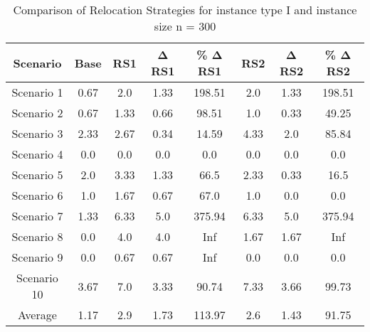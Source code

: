 \begin{table}[H]
\centering
\begin{tabular}{cccccccc}
  \hline
  \textbf{Scenario} & \textbf{Base} & \textbf{RS1} & \textbf{Δ RS1} & \textbf{\% Δ RS1} & \textbf{RS2} & \textbf{Δ RS2} & \textbf{\% Δ RS2} \\\hline
  Scenario 1 & 0.67 & 2.0 & 1.33 & 198.51 & 2.0 & 1.33 & 198.51 \\
  Scenario 2 & 0.67 & 1.33 & 0.66 & 98.51 & 1.0 & 0.33 & 49.25 \\
  Scenario 3 & 2.33 & 2.67 & 0.34 & 14.59 & 4.33 & 2.0 & 85.84 \\
  Scenario 4 & 0.0 & 0.0 & 0.0 & 0.0 & 0.0 & 0.0 & 0.0 \\
  Scenario 5 & 2.0 & 3.33 & 1.33 & 66.5 & 2.33 & 0.33 & 16.5 \\
  Scenario 6 & 1.0 & 1.67 & 0.67 & 67.0 & 1.0 & 0.0 & 0.0 \\
  Scenario 7 & 1.33 & 6.33 & 5.0 & 375.94 & 6.33 & 5.0 & 375.94 \\
  Scenario 8 & 0.0 & 4.0 & 4.0 & Inf & 1.67 & 1.67 & Inf \\
  Scenario 9 & 0.0 & 0.67 & 0.67 & Inf & 0.0 & 0.0 & 0.0 \\
  Scenario 10 & 3.67 & 7.0 & 3.33 & 90.74 & 7.33 & 3.66 & 99.73 \\
  Average & 1.17 & 2.9 & 1.73 & 113.97 & 2.6 & 1.43 & 91.75 \\\hline
\end{tabular}
\caption{Comparison of Relocation Strategies for instance type I and instance size n = 300}
\label{tab:wait:resrelocation-comparison_I_300}
\end{table}
